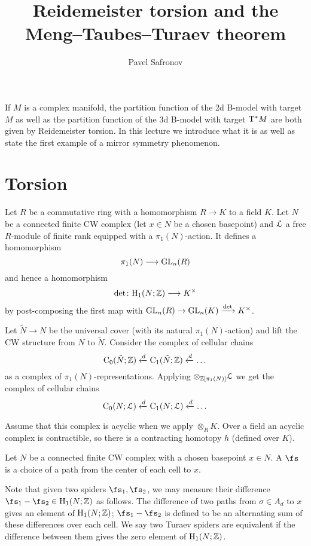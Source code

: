 
\title{Reidemeister torsion and the Meng--Taubes--Turaev theorem}
\author{Pavel Safronov}
\maketitle

If $M$ is a complex manifold, the partition function of the 2d B-model with target $M$ as well as the partition function of the 3d B-model with target $\mathrm{T}^* M$ are both given by Reidemeister torsion. In this lecture we introduce what it is as well as state the first example of a mirror symmetry phenomenon.

\section{Torsion}

Let $R$ be a commutative ring with a homomorphism $R\rightarrow K$ to a field $K$. Let $N$ be a connected finite CW complex (let $x\in N$ be a chosen basepoint) and $\mathcal{L}$ a free $R$-module of finite rank equipped with a $\pi_1(N)$-action. It defines a homomorphism
\[\pi_1(N)\longrightarrow \mathrm{GL}_n(R)\]
and hence a homomorphism
\[\det\colon \mathrm{H}_1(N;\mathbb{Z})\longrightarrow K^\times\]
by post-composing the first map with $\mathrm{GL}_n(R)\rightarrow \mathrm{GL}_n(K)\xrightarrow{\det} K^\times$.

Let $\tilde{N}\rightarrow N$ be the universal cover (with its natural $\pi_1(N)$-action) and lift the CW structure from $N$ to $\tilde{N}$. Consider the complex of cellular chains
\[\mathrm{C}_0(\tilde{N}; \mathbb{Z})\xleftarrow{d} \mathrm{C}_1(\tilde{N}; \mathbb{Z})\xleftarrow{d} \dots\]
as a complex of $\pi_1(N)$-representations. Applying $\otimes_{\mathbb{Z}[\pi_1(N)]}\mathcal{L}$ we get the complex of cellular chains
\[\mathrm{C}_0(N; \mathcal{L})\xleftarrow{d} \mathrm{C}_1(N; \mathcal{L})\xleftarrow{d} \dots\]

Assume that this complex is acyclic when we apply $\otimes_R K$. Over a field an acyclic complex is contractible, so there is a contracting homotopy $h$ (defined over $K$).

\begin{defn}
	Let $N$ be a connected finite CW complex with a chosen basepoint $x\in N$. A  $\fs$ is a choice of a path from the center of each cell to $x$.
\end{defn}

Note that given two spiders $\fs_1,\fs_2$, we may measure their difference $\fs_1-\fs_2\in\rH_1(N;\Z)$ as follows. The difference of two paths from $\sigma\in A_d$ to $x$ gives an element of $\mathrm{H}_1(N; \mathbb{Z})$; $\fs_1-\fs_2$ is defined to be an alternating sum of these differences over each cell. We say two Turaev spiders are equivalent if the difference between them gives the zero element of $\mathrm{H}_1(N; \mathbb{Z})$.

